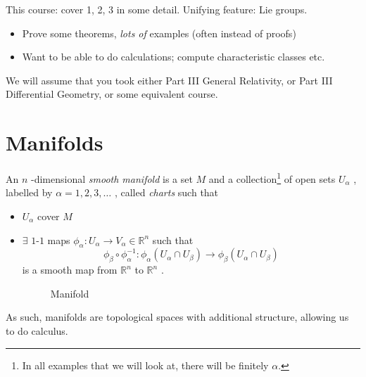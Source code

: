 This course: cover 1, 2, 3 in some detail. Unifying feature: Lie groups.
\begin{itemize}
  \item Prove some theorems, \emph{lots of} examples (often instead of proofs)
  \item Want to be able to do calculations; compute characteristic classes etc.
\end{itemize}
We will assume that you took either Part III General Relativity, or Part III Differential Geometry, or some equivalent course. 

\section{Manifolds}%
\label{sec:manifolds}

\begin{definition}[manifold]
  An $n$ -dimensional \emph{smooth manifold} is a set $M$  and a collection\footnote{In all examples that we will look at, there will be finitely $\alpha$.} of open sets $U_{\alpha}$ , labelled by $\alpha = 1, 2, 3, \dots$ , called \emph{charts} such that
  \begin{itemize}
    \item $U_{\alpha}$  cover $M$
     \item $\exists$  $1$-$1$ maps  $\phi_{\alpha} \colon U_{\alpha} \to V_{\alpha} \in \mathbb{R}^n$  such that
      \begin{equation}
	\phi_{\beta} \circ \phi_{\alpha}^{-1} \colon \phi_{\alpha}(U_{\alpha} \cap U_{\beta}) \to \phi_{\beta}(U_{\alpha} \cap U_{\beta})
      \end{equation}
      is a smooth map from $\mathbb{R}^n$  to $\mathbb{R}^n$ .
      \begin{figure}[tbhp]
        \centering
        \def\svgwidth{0.4\columnwidth}
        
        \caption{Manifold}
        \label{fig:manifold}
      \end{figure}
  \end{itemize}
\end{definition}

As such, manifolds are topological spaces with additional structure, allowing us to do calculus.

